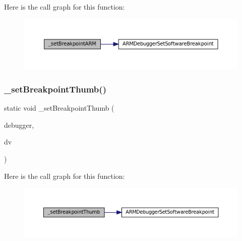 Here is the call graph for this function\+:
\nopagebreak
\begin{figure}[H]
\begin{center}
\leavevmode
\includegraphics[width=350pt]{arm_2debugger_2cli-debugger_8c_ae37b285f8c652414bf1f0aafa2d4909b_cgraph}
\end{center}
\end{figure}
\mbox{\label{arm_2debugger_2cli-debugger_8c_acad8c99d24d754d1ff65c79fdb18cf0e}} 
\subsubsection{\texorpdfstring{\+\_\+set\+Breakpoint\+Thumb()}{\_setBreakpointThumb()}}
{\footnotesize\ttfamily static void \+\_\+set\+Breakpoint\+Thumb (\begin{DoxyParamCaption}\item[{struct C\+L\+I\+Debugger $\ast$}]{debugger,  }\item[{struct C\+L\+I\+Debug\+Vector $\ast$}]{dv }\end{DoxyParamCaption})\hspace{0.3cm}{\ttfamily [static]}}

Here is the call graph for this function\+:
\nopagebreak
\begin{figure}[H]
\begin{center}
\leavevmode
\includegraphics[width=350pt]{arm_2debugger_2cli-debugger_8c_acad8c99d24d754d1ff65c79fdb18cf0e_cgraph}
\end{center}
\end{figure}
\mbox{\label{arm_2debugger_2cli-debugger_8c_a045f36ee0ea5e0ee4fbf4622bfb140ca}} 
